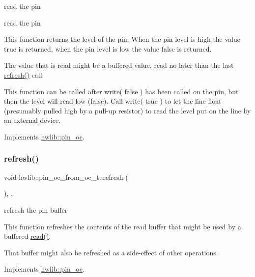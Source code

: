 read the pin

read the pin

This function returns the level of the pin. When the pin level is high the value true is returned, when the pin level is low the value false is returned.

The value that is read might be a buffered value, read no later than the last \hyperlink{classhwlib_1_1pin__oc__from__oc__t_a2bdf7192ad976dab785df8874267420d}{refresh()} call.

This function can be called after write( false ) has been called on the pin, but then the level will read low (false). Call write( true ) to let the line float (presumably pulled high by a pull-\/up resistor) to read the level put on the line by an external device. 

Implements \hyperlink{classhwlib_1_1pin__oc_a51180afd605add59b96105fa98e29f88}{hwlib\+::pin\+\_\+oc}.

\mbox{\label{classhwlib_1_1pin__oc__from__oc__t_a2bdf7192ad976dab785df8874267420d}} 
\subsubsection{\texorpdfstring{refresh()}{refresh()}}
{\footnotesize\ttfamily void hwlib\+::pin\+\_\+oc\+\_\+from\+\_\+oc\+\_\+t\+::refresh (\begin{DoxyParamCaption}{ }\end{DoxyParamCaption})\hspace{0.3cm}{\ttfamily [inline]}, {\ttfamily [override]}, {\ttfamily [virtual]}}





refresh the pin buffer

This function refreshes the contents of the read buffer that might be used by a buffered \hyperlink{classhwlib_1_1pin__oc__from__oc__t_aa896dfa412fe5644e0096b38c739cd42}{read()}.

That buffer might also be refreshed as a side-\/effect of other operations. 

Implements \hyperlink{classhwlib_1_1pin__oc_a573740f6f790c5792efc9cdd44cc73b3}{hwlib\+::pin\+\_\+oc}.

